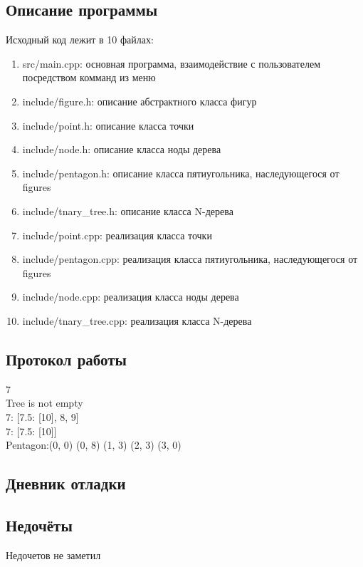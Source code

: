 \documentclass[12pt]{article}
\begin{document}
\subsection*{Описание программы}

Исходный код лежит в 10 файлах:
\begin{enumerate}
\item src/main.cpp: основная программа, взаимодействие с пользователем посредством комманд из меню

\item include/figure.h:    описание абстрактного класса фигур

\item include/point.h:     описание класса точки
\item include/node.h:  описание класса ноды дерева
\item include/pentagon.h: описание класса пятиугольника, наследующегося от figures
\item include/tnary\_tree.h:    описание класса N-дерева

\item include/point.cpp:     реализация класса точки
\item include/pentagon.cpp:  реализация класса пятиугольника, наследующегося от figures
\item include/node.cpp: реализация класса ноды дерева
\item include/tnary\_tree.cpp:    реализация класса N-дерева

\end{enumerate}

\subsection*{Протокол работы}
7 \\
Tree is not empty \\
7: [7.5: [10], 8, 9] \\
7: [7.5: [10]] \\
Pentagon:(0, 0) (0, 8) (1, 3) (2, 3) (3, 0) \\ 

\subsection*{Дневник отладки}


\subsection*{Недочёты}
Недочетов не заметил
\end{document}
